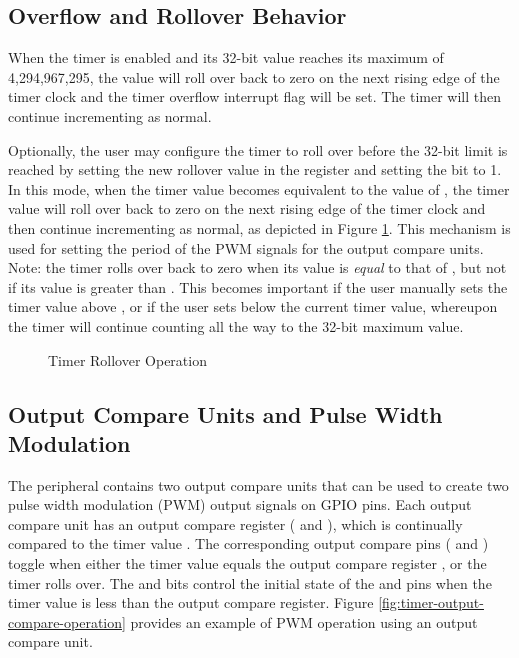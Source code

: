 \subsection{Overflow and Rollover Behavior}

When the timer is enabled and its 32-bit value reaches its maximum of 4,294,967,295, the value will roll over back to zero on the next rising edge of the timer clock and the timer overflow interrupt flag  will be set. The timer will then continue incrementing as normal.

Optionally, the user may configure the timer to roll over before the 32-bit limit is reached by setting the new rollover value in the  register and setting the  bit to 1. In this mode, when the timer value becomes equivalent to the value of , the timer value will roll over back to zero on the next rising edge of the timer clock and then continue incrementing as normal, as depicted in Figure \ref{fig:timer-rollover-operation}. This mechanism is used for setting the period of the PWM signals for the output compare units. Note: the timer rolls over back to zero when its value is \textit{equal} to that of , but not if its value is greater than . This becomes important if the user manually sets the timer value above , or if the user sets  below the current timer value, whereupon the timer will continue counting all the way to the 32-bit maximum value.

\begin{figure}[htpb]
	
	\caption{Timer Rollover Operation}
	\label{fig:timer-rollover-operation}
\end{figure}




\subsection{Output Compare Units and Pulse Width Modulation}

The  peripheral contains two output compare units that can be used to create two pulse width modulation (PWM) output signals on GPIO pins. Each output compare unit has an output compare register ( and ), which is continually compared to the timer value . The corresponding output compare pins ( and ) toggle when either the timer value  equals the output compare register , or the timer rolls over. The  and  bits control the initial state of the  and  pins when the timer value is less than the output compare register. Figure \ref{fig:timer-output-compare-operation} provides an example of PWM operation using an output compare unit.

